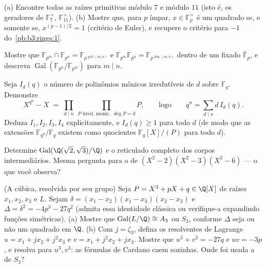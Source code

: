 \begin{exercise}[$\star\star$]\label{exo:b3:galois:4}
(a) Encontre todas as raízes primitivas módulo $7$ e módulo
$11$ (isto é, os geradores de $\mathbb F_7^\times$, $\mathbb F_{11}^\times$).
(b) Mostre que, para $p$ ímpar, $x \in \mathbb F_p^\times$ é um quadrado se, e somente
se, $x^{(p-1)/2} = 1$ (critério de Euler), e recupere o critério para $-1$
do~\cref{pb:b3:rings:1}.
\end{exercise}

\begin{exercise}[$\star\star$]\label{exo:b3:galois:5}
Mostre que $\mathbb F_{p^m} \cap \mathbb F_{p^n} = \mathbb
F_{p^{\gcd(m,n)}}$ e $\mathbb F_{p^m}\mathbb F_{p^n} = \mathbb
F_{p^{\operatorname{lcm}(m,n)}}$ dentro de um  fixado $\bar{\mathbb F}_p$, e
descreva $\operatorname{Gal}(\mathbb F_{p^n}/\mathbb F_{p^m})$ para $m
\mid n$.
\end{exercise}

\begin{exercise}[$\star\star$]\label{exo:b3:galois:6}
Seja $I_d(q)$ o número de polinômios mônicos irredutíveis de 
$d$ sobre $\mathbb F_q$. Demonstre
\[
X^{q^n} - X \;=\; \prod_{d \mid n}\ \prod_{P \text{ irred.
monic, } \deg P = d} P ,
\qquad\text{logo}\qquad
q^n = \sum_{d \mid n} d\, I_d(q).
\]
Deduza $I_1, I_2, I_3, I_4$ explicitamente, e $I_d(q) \geq 1$ para todo $d$ (de modo que as
extensões $\mathbb F_{q^d}/\mathbb F_q$ existem como quocientes $\mathbb F_q[X]/(P)$ para todo $d$).
\end{exercise}

\begin{exercise}[$\star\star$]\label{exo:b3:galois:7}
Determine $\operatorname{Gal}(\Q(\sqrt2,\sqrt3)/\Q)$ e o reticulado completo dos corpos intermediários.
Mesma pergunta para o  de $(X^2-2)(X^2-3)(X^2-6)$ --- o que você
observa?
\end{exercise}

\begin{exercise}[$\star\star$]\label{exo:b3:galois:8}
(A cúbica, resolvida por seu grupo) Seja $P = X^3 + pX + q \in
\Q[X]$  de raízes
$x_1, x_2, x_3$ e  $L$. Sejam $\delta = (x_1 - x_2)(x_1 - x_3)(x_2 - x_3)$ e $\Delta = \delta^2 = -4p^3 - 27q^2$ (admita essa
identidade clássica ou verifique-a expandindo funções simétricas).
(a) Mostre que $\operatorname{Gal}(L/\Q) \cong A_3$ ou $S_3$, conforme $\Delta$ seja ou não um
quadrado em $\Q$.
(b) Com $j = \zeta_3$, defina os resolventes de Lagrange $u = x_1
+ jx_2 + j^2x_3$ e $v = x_1 + j^2x_2 + jx_3$. Mostre
que $u^3 + v^3
= -27q$ e $uv = -3p$, e resolva para $u^3, v^3$: as fórmulas de Cardano caem
sozinhas. Onde foi usada a  de $S_3$?
\end{exercise}

